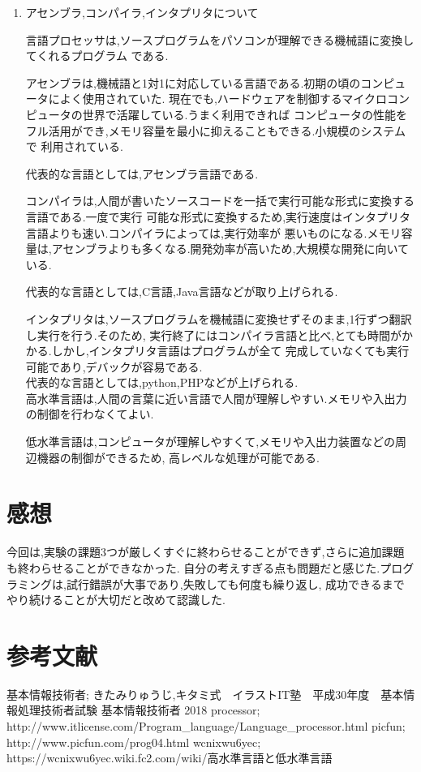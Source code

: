 \documentclass[a4paper,11pt,titlepage]{jarticle}
\begin{document}
\begin{enumerate}
  \item
    アセンブラ,コンパイラ,インタプリタについて\par
      言語プロセッサは,ソースプログラムをパソコンが理解できる機械語に変換してくれるプログラム
    である.\par
      アセンブラは,機械語と1対1に対応している言語である.初期の頃のコンピュータによく使用されていた.
    現在でも,ハードウェアを制御するマイクロコンピュータの世界で活躍している.うまく利用できれば
    コンピュータの性能をフル活用ができ,メモリ容量を最小に抑えることもできる.小規模のシステムで
    利用されている.\par
  代表的な言語としては,アセンブラ言語である.\par
      コンパイラは,人間が書いたソースコードを一括で実行可能な形式に変換する言語である.一度で実行
    可能な形式に変換するため,実行速度はインタプリタ言語よりも速い.コンパイラによっては,実行効率が
    悪いものになる.メモリ容量は,アセンブラよりも多くなる.開発効率が高いため,大規模な開発に向いている.\par
      代表的な言語としては,C言語,Java言語などが取り上げられる.\par
      インタプリタは,ソースプログラムを機械語に変換せずそのまま,1行ずつ翻訳し実行を行う.そのため,
    実行終了にはコンパイラ言語と比べ,とても時間がかかる.しかし,インタプリタ言語はプログラムが全て
    完成していなくても実行可能であり,デバックが容易である.\\
      代表的な言語としては,python,PHPなどが上げられる.\\
      高水準言語は,人間の言葉に近い言語で人間が理解しやすい.メモリや入出力の制御を行わなくてよい.\par
      低水準言語は,コンピュータが理解しやすくて,メモリや入出力装置などの周辺機器の制御ができるため,
    高レベルな処理が可能である.
\end{enumerate}

\section{感想}
      今回は,実験の課題3つが厳しくすぐに終わらせることができず,さらに追加課題も終わらせることができなかった.
    自分の考えすぎる点も問題だと感じた.プログラミングは,試行錯誤が大事であり,失敗しても何度も繰り返し,
    成功できるまでやり続けることが大切だと改めて認識した.
\section{参考文献}
 \begin{thebibliography}{99}
 基本情報技術者; きたみりゅうじ,キタミ式　イラストIT塾　平成30年度　基本情報処理技術者試験
基本情報技術者 2018
  processor; http://www.it\-license.com/Program\_language/Language\_processor.html
  picfun; http://www.picfun.com/prog04.html
  wcnixwu6yec; https://wcnixwu6yec.wiki.fc2.com/wiki/高水準言語と低水準言語
 \end{thebibliography}
\end{document}
